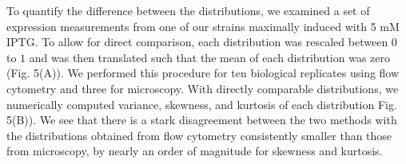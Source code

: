 \documentclass[letterpaper, 10pt]{article}
\begin{document}
\begin{figure}[ht]
  \label{fig:iptg_distributions}
\end{figure}

To quantify the difference between the distributions, we examined a set of
expression measurements from one of our strains maximally induced with 5 mM IPTG.
To allow for direct comparison, each distribution
was rescaled between $0$ to $1$ and was then translated
such that the mean of each distribution was zero (Fig. 5(A)). We performed this
procedure for ten biological replicates using flow cytometry and three for
microscopy. With directly comparable distributions, we numerically computed
variance, skewness, and kurtosis of each distribution Fig. 5(B)). We see that
there is a stark disagreement between the two methods with the distributions
obtained from flow cytometry consistently smaller than those from microscopy,
by nearly an order of magnitude for skewness and kurtosis.
\end{document}
